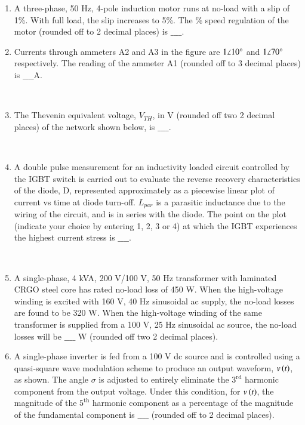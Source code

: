 \documentclass[journal]{IEEEtran}
\begin{document}
\begin{enumerate}
\item A three-phase, 50 Hz, 4-pole induction motor runs at no-load with a slip of 1\%. With full load, the slip increases to 5\%. The \% speed regulation of the motor (rounded off to 2 decimal places) is $\_\_\_\_$. \\
\item Currents through ammeters A2 and A3 in the figure are $1\angle{10\degree}$ and $1\angle{70\degree}$ respectively. The reading of
the ammeter A1 (rounded off to 3 decimal places) is $\_\_\_\_$A.
\begin{figure}[!ht]
\centering
\resizebox{0.5\textwidth}{!}{%

}%
\end{figure}\\
\item The Thevenin equivalent voltage, $V_{TH}$, in V (rounded off two 2 decimal places) of the network shown below, is $\_\_\_\_$.
\begin{figure}[!ht]
\centering
\resizebox{0.5\textwidth}{!}{%

}%
\end{figure}\\
\item A double pulse measurement for an inductivity loaded circuit controlled by the IGBT switch is carried out to evaluate the reverse recovery characteristics of the diode, D, represented approximately as a piecewise linear plot of current vs time at diode turn-off. $L_{par}$ is a parasitic inductance due to the wiring of the circuit, and is in series with the diode. The point on the plot (indicate your choice by entering 1, 2, 3 or 4) at which the IGBT experiences the highest current stress is $\_\_\_\_$.
\begin{figure}[!ht]
\centering
\resizebox{0.7\textwidth}{!}{%

}%
\end{figure}\\
\item A single-phase, 4 kVA, 200 V/100 V, 50 Hz transformer with laminated CRGO steel core has rated no-load loss of 450 W. When the high-voltage winding is excited with 160 V, 40 Hz sinusoidal ac supply, the no-load losses are found to be 320 W. When the high-voltage winding of the same transformer is supplied from a 100 V, 25 Hz sinusoidal ac source, the no-load losses will be $\_\_\_\_$ W (rounded off two 2 decimal places). \\
\item A single-phase inverter is fed from a 100 V dc source and is controlled using a quasi-square wave modulation scheme to produce an output waveform, $v\left(t\right)$, as shown. The angle $\sigma$ is adjusted to entirely eliminate the $3^{\text{rd}}$ harmonic component from the output voltage. Under this condition, for $v\left(t\right)$, the magnitude of the $5^{\text{th}}$ harmonic component as a percentage of the magnitude of the fundamental component is $\_\_\_\_$ (rounded off to 2 decimal places).

\end{enumerate}
\end{document}
